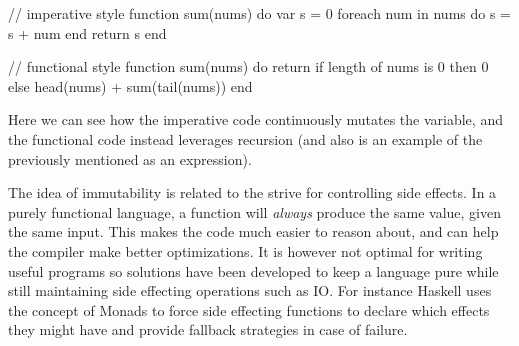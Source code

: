 \begin{pseudo}

// imperative style
function sum(nums) do
  var s = 0
  foreach num in nums do
    s = s + num
  end
  return s
end

// functional style
function sum(nums) do
  return if length of nums is 0
    then 0
    else head(nums) + sum(tail(nums))
end
\end{pseudo}

Here we can see how the imperative code continuously mutates the  variable, and the functional code instead leverages recursion (and also is an example of the previously mentioned  as an expression).

The idea of immutability is related to the strive for controlling side effects. In a purely functional language, a function will \emph{always} produce the same value, given the same input. This makes the code much easier to reason about, and can help the compiler make better optimizations. It is however not optimal for writing useful programs so solutions have been developed to keep a language pure while still maintaining side effecting operations such as IO. For instance Haskell uses the concept of Monads to force side effecting functions to declare which effects they might have and provide fallback strategies in case of failure.

